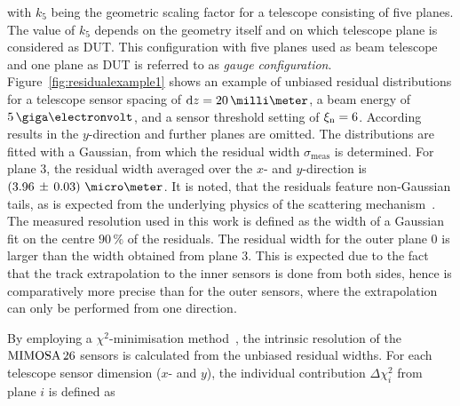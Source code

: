 \noindent
with $k_5$ being the geometric scaling factor for a telescope consisting of five planes. 
The value of $k_5$ depends on the geometry itself and on which telescope plane is considered as DUT. 
This configuration with five planes used as beam telescope and one plane as DUT is referred to as \textit{gauge configuration}. 
Figure~\ref{fig:residualexample1} shows an example of unbiased residual distributions for a telescope sensor spacing of $\dz = 20\,\milli\meter$,
 a beam energy of $5\,\giga\electronvolt$, and a sensor threshold setting of $\xi_{\textrm{n}} = 6$. 
According results in the $y$-direction and further planes are omitted. 
The distributions are fitted with a Gaussian, from which the residual width $\sigma_{\textrm{meas}}$ is determined. 
For plane $3$, the residual width averaged over the $x$- and $y$-direction is $\left( 3.96\,\pm\, \allowbreak 0.03 \right)\,\micro\meter$. 
It is noted, that the residuals feature non-Gaussian tails, as is expected from the underlying physics of the scattering mechanism~\cite{ref:PDG-2014}. 
The measured resolution used in this work is defined as the width of a Gaussian fit on the centre $90\,\%$ of the residuals. 
The residual width for the outer plane $0$ is larger than the width obtained from plane $3$.
This is expected due to the fact that the track extrapolation to the inner sensors is done from both sides, hence is comparatively more precise than for the outer sensors,
 where the extrapolation can only be performed from one direction. 






% 

By employing a $\chi^{2}$-minimisation method~\cite{ref:eudetmemo_2007_01,ref:lutzpaper}, the intrinsic resolution of the $\textrm{MIMOSA\,26}$ sensors is calculated from the unbiased residual widths.
For each telescope sensor dimension ($x$- and $y$), the individual contribution $\Delta \chi^2_{i}$ from plane $i$ is defined as


